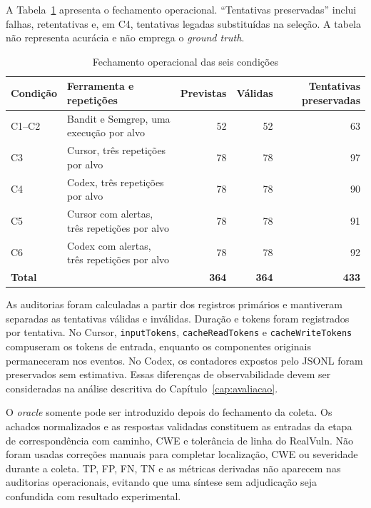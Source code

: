A Tabela~\ref{tab:fechamento-operacional-coleta} apresenta o fechamento operacional. ``Tentativas preservadas'' inclui falhas, retentativas e, em C4, tentativas legadas substituídas na seleção. A tabela não representa acurácia e não emprega o \textit{ground truth}.

\begin{table}[htb]
\ABNTEXfontereduzida
\caption{Fechamento operacional das seis condições}
\label{tab:fechamento-operacional-coleta}
\centering
\begin{tabularx}{\textwidth}{|l|X|r|r|r|}
\hline
\textbf{Condição} & \textbf{Ferramenta e repetições} & \textbf{Previstas} & \textbf{Válidas} & \textbf{Tentativas preservadas} \\
\hline
C1--C2 & Bandit e Semgrep, uma execução por alvo & 52 & 52 & 63 \\
\hline
C3 & Cursor, três repetições por alvo & 78 & 78 & 97 \\
\hline
C4 & Codex, três repetições por alvo & 78 & 78 & 90 \\
\hline
C5 & Cursor com alertas, três repetições por alvo & 78 & 78 & 91 \\
\hline
C6 & Codex com alertas, três repetições por alvo & 78 & 78 & 92 \\
\hline
\textbf{Total} & & \textbf{364} & \textbf{364} & \textbf{433} \\
\hline
\end{tabularx}
\end{table}

As auditorias foram calculadas a partir dos registros primários e mantiveram separadas as tentativas válidas e inválidas. Duração e tokens foram registrados por tentativa. No Cursor, \texttt{inputTokens}, \texttt{cacheReadTokens} e \texttt{cacheWriteTokens} compuseram os tokens de entrada, enquanto os componentes originais permaneceram nos eventos. No Codex, os contadores expostos pelo JSONL foram preservados sem estimativa. Essas diferenças de observabilidade devem ser consideradas na análise descritiva do Capítulo~\ref{cap:avaliacao}.

O \textit{oracle} somente pode ser introduzido depois do fechamento da coleta. Os achados normalizados e as respostas validadas constituem as entradas da etapa de correspondência com caminho, CWE e tolerância de linha do RealVuln. Não foram usadas correções manuais para completar localização, CWE ou severidade durante a coleta. TP, FP, FN, TN e as métricas derivadas não aparecem nas auditorias operacionais, evitando que uma síntese sem adjudicação seja confundida com resultado experimental.

